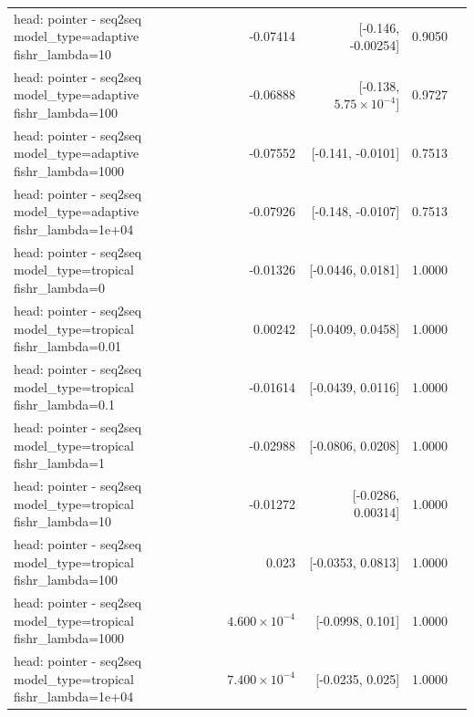 \documentclass[10pt]{article}
\makeatletter
\newcommand{\stackcell}[1]{\begin{tabular}[t]{@{}l@{}}#1\end{tabular}}
\makeatother
\begin{document}
{\begin{longtable}{lrrrl}
\stackcell{head: pointer - seq2seq\\\footnotesize model\_type=adaptive fishr\_lambda=10 } & -0.07414 & [-0.146, -0.00254] & 0.9050 & \\
\stackcell{head: pointer - seq2seq\\\footnotesize model\_type=adaptive fishr\_lambda=100 } & -0.06888 & [-0.138, $5.75\times10^{-4}$] & 0.9727 & \\
\stackcell{head: pointer - seq2seq\\\footnotesize model\_type=adaptive fishr\_lambda=1000 } & -0.07552 & [-0.141, -0.0101] & 0.7513 & \\
\stackcell{head: pointer - seq2seq\\\footnotesize model\_type=adaptive fishr\_lambda=1e+04 } & -0.07926 & [-0.148, -0.0107] & 0.7513 & \\
\stackcell{head: pointer - seq2seq\\\footnotesize model\_type=tropical fishr\_lambda=0 } & -0.01326 & [-0.0446, 0.0181] & 1.0000 & \\
\stackcell{head: pointer - seq2seq\\\footnotesize model\_type=tropical fishr\_lambda=0.01 } & 0.00242 & [-0.0409, 0.0458] & 1.0000 & \\
\stackcell{head: pointer - seq2seq\\\footnotesize model\_type=tropical fishr\_lambda=0.1 } & -0.01614 & [-0.0439, 0.0116] & 1.0000 & \\
\stackcell{head: pointer - seq2seq\\\footnotesize model\_type=tropical fishr\_lambda=1 } & -0.02988 & [-0.0806, 0.0208] & 1.0000 & \\
\stackcell{head: pointer - seq2seq\\\footnotesize model\_type=tropical fishr\_lambda=10 } & -0.01272 & [-0.0286, 0.00314] & 1.0000 & \\
\stackcell{head: pointer - seq2seq\\\footnotesize model\_type=tropical fishr\_lambda=100 } & 0.023 & [-0.0353, 0.0813] & 1.0000 & \\
\stackcell{head: pointer - seq2seq\\\footnotesize model\_type=tropical fishr\_lambda=1000 } & $4.600\times10^{-4}$ & [-0.0998, 0.101] & 1.0000 & \\
\stackcell{head: pointer - seq2seq\\\footnotesize model\_type=tropical fishr\_lambda=1e+04 } & $7.400\times10^{-4}$ & [-0.0235, 0.025] & 1.0000 & \\

\end{longtable}}
\end{document}

